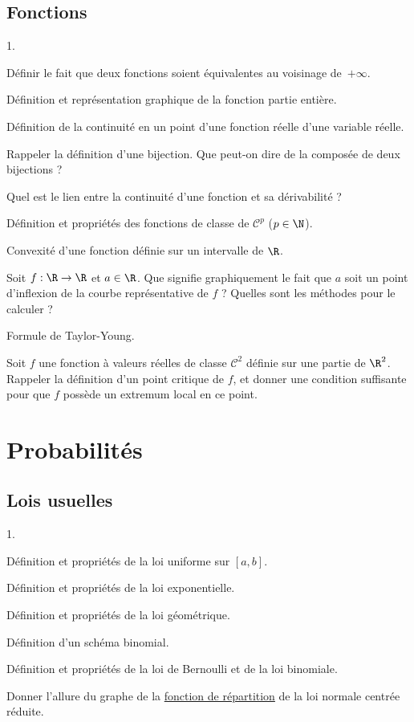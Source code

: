 \documentclass[11pt]{article}%
\begin{document}
\subsection*{Fonctions}

\begin{noliste}{1.}
\item Définir le fait que deux fonctions soient équivalentes au
  voisinage de~$+\infty$.
\item Définition et représentation graphique de la fonction partie entière.
\item Définition de la continuité en un point d'une fonction réelle
  d'une variable réelle.
\item Rappeler la définition d'une bijection. Que peut-on dire de la
  composée de deux bijections ?
\item Quel est le lien entre la continuité d'une fonction et sa
  dérivabilité ?
\item Définition et propriétés des fonctions de classe de
  $\mathcal{C}^p$ ($p\in \N$).
\item Convexité d'une fonction définie sur un intervalle de $\R$.
\item Soit $f:\R \to \R$ et $a\in \R$. Que signifie graphiquement le
  fait que $a$ soit un point d'inflexion de la courbe représentative
  de $f$ ? Quelles sont les méthodes pour le calculer ?
\item Formule de Taylor-Young.
\item Soit $f$ une fonction à valeurs réelles de classe
  $\mathcal{C}^2$ définie sur une partie de $\R^2$. Rappeler la
  définition d'un point critique de $f$, et donner une condition
  suffisante pour que $f$ possède un extremum local en ce point.
\end{noliste}

\section*{Probabilités}

\subsection*{Lois usuelles}

\begin{noliste}{1.}
\item Définition et propriétés de la loi uniforme sur $[a,b]$.
\item Définition et propriétés de la loi exponentielle.
\item Définition et propriétés de la loi géométrique.
\item Définition d'un schéma binomial.
\item Définition et propriétés de la loi de Bernoulli et de la loi
  binomiale.
\item Donner l'allure du graphe de la \underline{fonction de
    répartition} de la loi normale centrée réduite.
\end{noliste}
\end{document}
